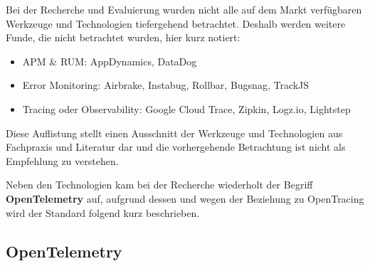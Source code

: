 Bei der Recherche und Evaluierung wurden nicht alle auf dem Markt verfügbaren Werkzeuge und Technologien tiefergehend betrachtet. Deshalb werden weitere Funde, die nicht betrachtet wurden, hier kurz notiert:

\begin{itemize}
	\item APM \& RUM: AppDynamics, DataDog
	\item Error Monitoring: Airbrake, Instabug, Rollbar, Bugsnag, TrackJS
	\item Tracing oder Observability: Google Cloud Trace, Zipkin, Logz.io, Lightstep
\end{itemize}

Diese Auflistung stellt einen Ausschnitt der Werkzeuge und Technologien aus Fachpraxis und Literatur dar und die vorhergehende Betrachtung ist nicht als Empfehlung zu verstehen.

Neben den Technologien kam bei der Recherche wiederholt der Begriff \textbf{OpenTelemetry} auf, aufgrund dessen und wegen der Beziehung zu OpenTracing wird der Standard folgend kurz beschrieben.

\newpage

\subsection{OpenTelemetry}

